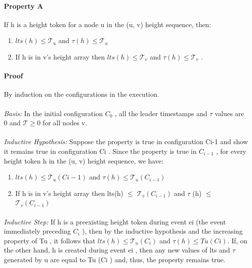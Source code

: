 \paragraph{Property A} If h is a height token for a node u in the (u, v) height sequence, then:
\begin{enumerate}
	\item $lts(h) \leq \mathcal{T} _u$ and $\tau (h) \leq \mathcal{T} _u$
	\item If h is in v’s height array then $lts(h) \leq \mathcal{T} _v$ and $\tau (h) \leq \mathcal{T} _v$ .
\end{enumerate}

\paragraph{Proof}By induction on the configurations in the execution.
\paragraph{}\textit{Basis:} In the initial configuration $C_0$ , all the leader timestamps and $\tau$ values are 0 and $\mathcal{T} \geq 0$ for all nodes v.
\paragraph{}\textit{Inductive Hypothesis:} Suppose the property is true in configuration Ci-1 and show it remains true in configuration Ci . Since the property is true in $C_{i-1}$ , for every height token h in the (u, v) height sequence, we have:
\begin{enumerate} [label=(\roman*)]
	\item $lts(h) \leq \mathcal{T} _u(Ci-1)$ and $\tau (h) \leq \mathcal{T} _u(C_{i-1})$
	\item If h is in v’s height array then lts(h) $\leq$ $\mathcal{T} _v(C_{i-1})$ and $\tau$ (h) $\leq$ $\mathcal{T} _v (C_{i-1})$
\end{enumerate}
\paragraph{}\textit{Inductive Step:} If h is a preexisting height token during event ei (the event immediately preceding $C_i$ ), then by the inductive hypothesis and the increasing property of Tu , it follows that $lts(h) \leq \mathcal{T} _u (C_i )$ and $\tau (h) \leq Tu (Ci )$. If, on the other hand, h is created during event ei , then any new values of lts and $\tau$ generated by u are equal to Tu (Ci ) and, thus, the property remains true.
